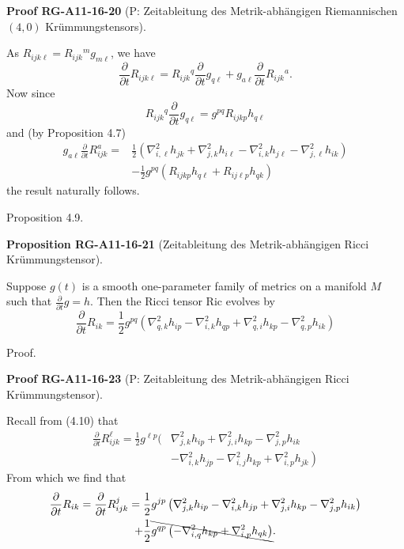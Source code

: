 \documentclass[10pt, letterpaper]{article}
\newcommand{\CustomHeading}[3]{%
  \par\medskip\noindent%
  \textbf{#1 #2} \textnormal{(#3)}.\enskip%
}
\newenvironment{PROP}[2]{\begin{unitbox}\CustomHeading{Proposition}{#1}{#2}}{\end{unitbox}}
\newenvironment{PROOF}[2]{\begin{unitbox}\CustomHeading{Proof}{#1}{#2}}{\end{unitbox}}
\begin{document}
\begin{PROOF}{RG-A11-16-20}{P: Zeitableitung des Metrik-abhängigen Riemannischen $(4,0)$ Krümmungstensors}
As $R_{i j k \ell}=R_{i j k}{ }^{m} g_{m \ell}$, we have
$$
\frac{\partial}{\partial t} R_{i j k \ell}=R_{i j k}{ }^{q} \frac{\partial}{\partial t} g_{q \ell}+g_{a \ell} \frac{\partial}{\partial t} R_{i j k}{ }^{a} .
$$
Now since
$$
R_{i j k}{ }^{q} \frac{\partial}{\partial t} g_{q \ell}=g^{p q} R_{i j k p} h_{q \ell}
$$
and (by Proposition 4.7)
$$
\begin{aligned}
g_{a \ell} \frac{\partial}{\partial t} R_{i j k}^{a}= & \frac{1}{2}\left(\nabla_{i, \ell}^{2} h_{j k}+\nabla_{j, k}^{2} h_{i \ell}-\nabla_{i, k}^{2} h_{j \ell}-\nabla_{j, \ell}^{2} h_{i k}\right) \\
& -\frac{1}{2} g^{p q}\left(R_{i j k p} h_{q \ell}+R_{i j \ell p} h_{q k}\right)
\end{aligned}
$$
the result naturally follows.
\end{PROOF}





Proposition 4.9. 


\begin{PROP}{RG-A11-16-21}{Zeitableitung des Metrik-abhängigen Ricci Krümmungstensor}
Suppose $g(t)$ is a smooth one-parameter family of metrics on a manifold $M$ such that $\frac{\partial}{\partial t} g=h$. Then the Ricci tensor Ric evolves by
$$
\frac{\partial}{\partial t} R_{i k}=\frac{1}{2} g^{p q}\left(\nabla_{q, k}^{2} h_{i p}-\nabla_{i, k}^{2} h_{q p}+\nabla_{q, i}^{2} h_{k p}-\nabla_{q, p}^{2} h_{i k}\right)
$$
\end{PROP}



Proof. 


\begin{PROOF}{RG-A11-16-23}{P: Zeitableitung des Metrik-abhängigen Ricci Krümmungstensor}
Recall from (4.10) that
$$
\begin{aligned}
\frac{\partial}{\partial t} R_{i j k}^{\ell}=\frac{1}{2} g^{\ell p}( & \nabla_{j, k}^{2} h_{i p}+\nabla_{j, i}^{2} h_{k p}-\nabla_{j, p}^{2} h_{i k} \\
& \left.-\nabla_{i, k}^{2} h_{j p}-\nabla_{i, j}^{2} h_{k p}+\nabla_{i, p}^{2} h_{j k}\right)
\end{aligned}
$$
From which we find that
$$
\begin{gathered}
\frac{\partial}{\partial t} R_{i k}=\frac{\partial}{\partial t} R_{i j k}^{j}=\frac{1}{2} g^{j p}\left(\nabla_{j, k}^{2} h_{i p}-\nabla_{i, k}^{2} h_{j p}+\nabla_{j, i}^{2} h_{k p}-\nabla_{j, p}^{2} h_{i k}\right) \\
+\frac{1}{2} \bcancel{g^{q p}\left(-\nabla_{i, q}^{2} h_{k p}+\nabla_{i, p}^{2} h_{q k}\right)} .
\end{gathered}
$$
\end{PROOF}
\end{document}

